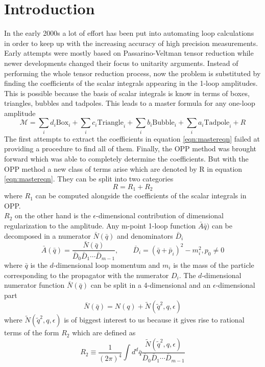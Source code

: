 \section{Introduction}
\label{sec:Introduction} 
In the early 2000s a lot of effort has been put into automating loop calculations in order to keep up with the increasing accuracy of high precision measurements. Early attempts were mostly based on Passarino-Veltman tensor reduction while newer developments changed their focus to unitarity arguments. Instead of performing the whole tensor reduction process, now the problem is substituted by finding the coefficients of the scalar integrals appearing in the 1-loop amplitudes. This is possible because the basis of scalar integrals is know in terms of boxes, triangles, bubbles and tadpoles. This leads to a master formula for any one-loop amplitude
\begin{equation}
\label{eqn:mastereqn}
\mathcal{M} = \sum_i d_i \mathrm{Box}_i + \sum_i c_i \mathrm{Triangle}_i + \sum_i b_i \mathrm{Bubble}_i + \sum_i a_i \mathrm{Tadpole}_i + R
\end{equation}
The first attempts to extract the coefficients in equation \ref{eqn:mastereqn} failed at providing a procedure to find all of them. Finally, the OPP method was brought forward which was able to completely determine the coefficients. But with the OPP method a new class of terms arise which are denoted by R in equation \ref{eqn:mastereqn}. They can be split into two categories
\begin{equation}
R = R_1 + R_2
\end{equation}
where $R_1$ can be computed alongside the coefficients of the scalar integrals in OPP. \\
 $R_2$ on the other hand is the $\epsilon$-dimensional contribution of dimensional regularization to the amplitude. Any m-point 1-loop function $\bar{A}\bar{q})$ can be decomposed in a numerator $\bar{N}( \bar{q})$ and denominators $\bar{D}_i$
\begin{equation}
\label{eqn:amp}
\bar{A} (\bar{q}) = \frac{\bar{N}(\bar{q})}{\bar{D}_0\bar{D}_1\cdots\bar{D}_{m-1}}, \qquad \bar{D}_i = \left( \bar{q} + \bar{p}_i \right)^2 - m_i^2, p_0 \neq 0
\end{equation}
where $\bar{q}$ is the $d$-dimensional loop momentum and $m_i$ is the mass of the particle corresponding to the propagator with the numerator $D_i$. The $d$-dimensional numerator function $\bar{N}(\bar{q})$ can be split in a 4-dimensional and an $\epsilon$-dimensional part 
\begin{equation}
\bar{N}( \bar{q}) = N (q) + \tilde{N} (\tilde{q}^2,q,\epsilon)
\end{equation}
where $\tilde{N} (\tilde{q}^2,q,\epsilon)$ is of biggest interest to us because it gives rise to rational terms of the form $R_2$ which are defined as
\begin{equation}
R_2 \equiv \frac{1}{\left( 2\pi \right)^4} \int d^d \bar{q} \frac{\tilde{N} ( \tilde{q}^2,q,\epsilon)}{\bar{D}_0\bar{D}_1\cdots\bar{D}_{m-1}}
\end{equation} 

